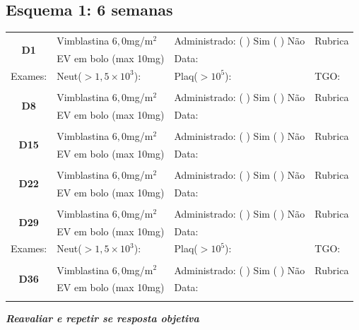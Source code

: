 \documentclass[11pt,a4paper,oldfontcommands]{memoir}
\begin{document}
\hfill\\

\hfill  {}\\

\subsection{Esquema 1: 6 semanas}
\begin{center}
\begin{longtable}{p{1cm}p{5cm}|p{5cm}|p{3cm}}
    \hline
    \multicolumn{1}{c|}{\multirow{2}{*}{\textbf{D1}}}&{Vimblastina \(6,0\)mg/m\(^2\)}&{Administrado: (  ) Sim (  ) Não}&{Rubrica}\\
    \multicolumn{1}{c|}{}&{EV em bolo (max 10mg)}&{Data:}&\\
    \hline
    {\tiny{Exames:}}&{\tiny{Neut(\(>1,5\times10^3\)):}}&{\tiny{Plaq(\(>10^5\)):}}&{\tiny{TGO:}}
    \\
    \hline
    \\
    \hline
    \multicolumn{1}{c|}{\multirow{2}{*}{\textbf{D8}}}&{Vimblastina \(6,0\)mg/m\(^2\)}&{Administrado: (  ) Sim (  ) Não}&{Rubrica}\\
    \multicolumn{1}{c|}{}&{EV em bolo (max 10mg)}&{Data:}&\\
    \hline
    \\
    \hline
    \multicolumn{1}{c|}{\multirow{2}{*}{\textbf{D15}}}&{Vimblastina \(6,0\)mg/m\(^2\)}&{Administrado: (  ) Sim (  ) Não}&{Rubrica}\\
    \multicolumn{1}{c|}{}&{EV em bolo (max 10mg)}&{Data:}&\\
    \hline
    \\
    \hline
    \multicolumn{1}{c|}{\multirow{2}{*}{\textbf{D22}}}&{Vimblastina \(6,0\)mg/m\(^2\)}&{Administrado: (  ) Sim (  ) Não}&{Rubrica}\\
    \multicolumn{1}{c|}{}&{EV em bolo (max 10mg)}&{Data:}&\\
    \hline
    \\
    \hline
    \multicolumn{1}{c|}{\multirow{2}{*}{\textbf{D29}}}&{Vimblastina \(6,0\)mg/m\(^2\)}&{Administrado: (  ) Sim (  ) Não}&{Rubrica}\\
    \multicolumn{1}{c|}{}&{EV em bolo (max 10mg)}&{Data:}&\\
    \hline
    {\tiny{Exames:}}&{\tiny{Neut(\(>1,5\times10^3\)):}}&{\tiny{Plaq(\(>10^5\)):}}&{\tiny{TGO:}}
    \\
    \hline\\
    \hline
    \multicolumn{1}{c|}{\multirow{2}{*}{\textbf{D36}}}&{Vimblastina \(6,0\)mg/m\(^2\)}&{Administrado: (  ) Sim (  ) Não}&{Rubrica}\\
    \multicolumn{1}{c|}{}&{EV em bolo (max 10mg)}&{Data:}&\\
    \hline
    \\
   \hline
\end{longtable}
\textbf{\textit{Reavaliar e repetir se resposta objetiva}}
\end{center}
\end{document}
